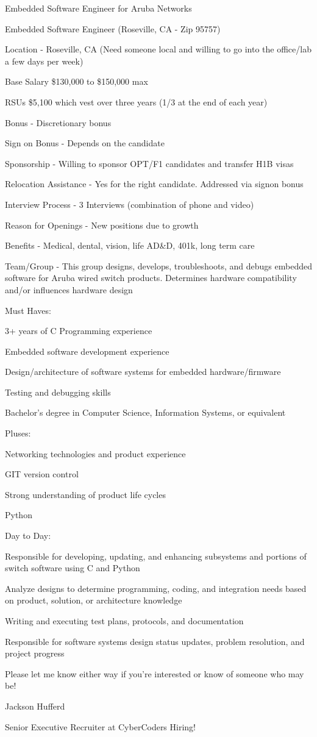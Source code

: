 

Embedded Software Engineer for Aruba Networks

Embedded Software Engineer (Roseville, CA - Zip 95757) 

Location - Roseville, CA (Need someone local and willing to go into the office/lab a few days per week)

Base Salary \- \$130,000 to \$150,000 max 

RSUs \- \$5,100 which vest over three years (1/3 at the end of each year)

Bonus - Discretionary bonus

Sign on Bonus - Depends on the candidate

Sponsorship - Willing to sponsor OPT/F1 candidates and transfer H1B visas

Relocation Assistance - Yes for the right candidate.  Addressed via sign\-on bonus

Interview Process - 3 Interviews (combination of phone and video)

Reason for Openings - New positions due to growth

Benefits - Medical, dental, vision, life AD\&D, 401k, long term care

Team/Group - This group designs, develops, troubleshoots, and debugs embedded software for Aruba wired switch products.  Determines hardware compatibility and/or influences hardware design

Must Haves:

3+ years of C Programming experience

Embedded software development experience

Design/architecture of software systems for embedded hardware/firmware

Testing and debugging skills

Bachelor’s degree in Computer Science, Information Systems, or equivalent

Pluses:

Networking technologies and product experience

GIT version control

Strong understanding of product life cycles

Python

Day to Day:

Responsible for developing, updating, and enhancing subsystems and portions of switch software using C and Python

Analyze designs to determine programming, coding, and integration needs based on product, solution, or architecture knowledge

Writing and executing test plans, protocols, and documentation

Responsible for software systems design status updates, problem resolution, and project progress

Please let me know either way if you're interested or know of someone who may be!

Jackson Hufferd

Senior Executive Recruiter at CyberCoders\- Hiring!

\bye
